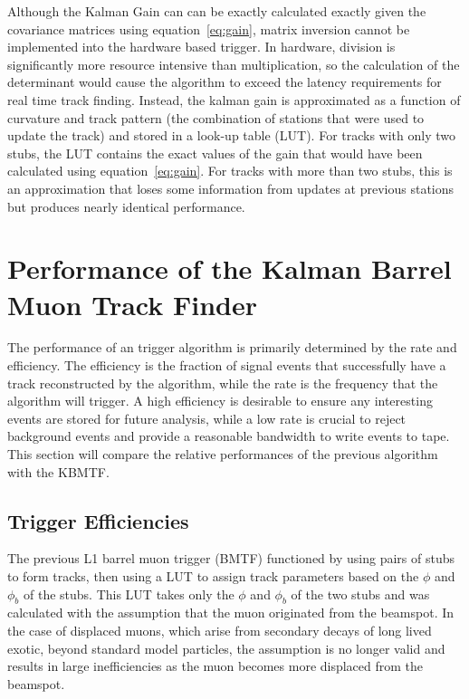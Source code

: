 Although the Kalman Gain can can be exactly calculated exactly given the covariance matrices using equation~\ref{eq:gain}, matrix inversion cannot be implemented into the hardware based trigger. In hardware, division is significantly more resource intensive than multiplication, so the calculation of the determinant would cause the algorithm to exceed the latency requirements for real time track finding. Instead, the kalman gain is approximated as a function of curvature and track pattern (the combination of stations that were used to update the track) and stored in a look-up table (LUT). For tracks with only two stubs, the LUT contains the exact values of the gain that would have been calculated using equation~\ref{eq:gain}. For tracks with more than two stubs, this is an approximation that loses some information from updates at previous stations but produces nearly identical performance.

\section{Performance of the Kalman Barrel Muon Track Finder} \label{sec:kmtf_performance}
The performance of an trigger algorithm is primarily determined by the rate and efficiency. The efficiency is the fraction of signal events that successfully have a track reconstructed by the algorithm, while the rate is the frequency that the algorithm will trigger. A high efficiency is desirable to ensure any interesting events are stored for future analysis, while a low rate is crucial to reject background events and provide a reasonable bandwidth to write events to tape. This section will compare the relative performances of the previous algorithm with the KBMTF.

\subsection{Trigger Efficiencies} \label{sec:kmtf_eff}
The previous L1 barrel muon trigger (BMTF) functioned by using pairs of stubs to form tracks, then using a LUT to assign track parameters based on the $\phi$ and $\phi_b$ of the stubs. This LUT takes only the $\phi$ and $\phi_b$ of the two stubs and was calculated with the assumption that the muon originated from the beamspot. In the case of displaced muons, which arise from secondary decays of long lived exotic, beyond standard model particles, the assumption is no longer valid and results in large inefficiencies as the muon becomes more displaced from the beamspot.


